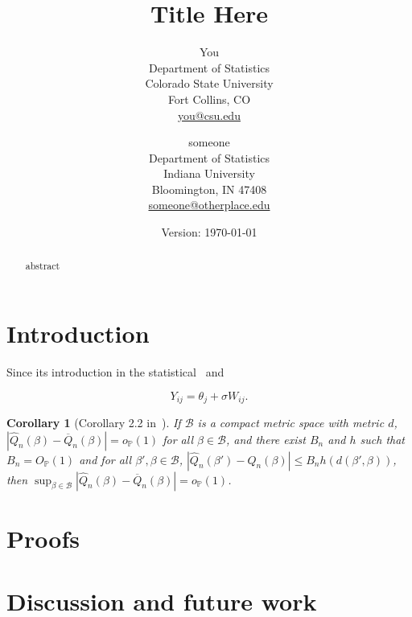 \documentclass[11pt]{article}
\newcommand{\email}[1]{\href{mailto:#1}{#1}}
\newtheorem{corollary}[cor]{Corollary}
\renewcommand{\hat}[1]{\widehat{#1}}
\renewcommand{\P}{\mathbb{P}}
\begin{document}
\title{Title Here}

\author{You\\Department of Statistics\\Colorado State
  University\\Fort Collins, CO\\\email{you@csu.edu} 
  \and someone\\Department of Statistics\\Indiana University\\
  Bloomington, IN 47408\\\email{someone@otherplace.edu}}
\date{Version: \today}

\maketitle

\begin{abstract}
abstract
\end{abstract}

 



\section{Introduction}
Since its introduction in the statistical~\citep{Tibshirani1996} and

\begin{equation}
  Y_{ij} = \theta_j + \sigma W_{ij}.
  \label{eq:sequenceModel}
\end{equation} 
\begin{corollary}
  [Corollary 2.2 in~\citep{Newey1991}]
  \label{cor:newey}
  If $\mathcal{B}$ is a compact metric space with metric $d$, $|\hat{Q}_n(\beta) -
  \overline{Q}_n(\beta)| = o_\P(1)$ for all $\beta \in \mathcal{B}$, and
  there exist $B_n$ and $h$ such that $B_n=O_\P(1)$ and for all
  $\beta',\beta \in \mathcal{B}$, $|\hat{Q}_n(\beta') -
  \hat{Q}_n(\beta)| \leq B_n h(d(\beta',\beta))$, then $\sup_{\beta \in \mathcal{B}}
  |\hat{Q}_n(\beta) - \overline{Q}_n(\beta)| = o_\P(1)$.
\end{corollary}


\section{Proofs}
\label{sec:proofs}

\section{Discussion and future work}
\label{sec:discussion}




\end{document}

